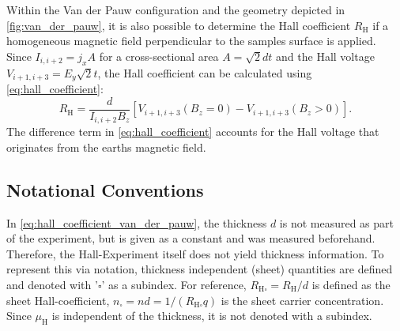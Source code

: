 Within the Van der Pauw configuration and the geometry depicted in 
\cref{fig:van_der_pauw}, it is also possible to determine the Hall 
coefficient $R_{\mathrm{H}}$ if a homogeneous magnetic field perpendicular to the 
samples surface is applied.
Since $I_{i, i+2}= j_x A$ for a cross-sectional area 
$A = \sqrt{2} d t$ and the Hall voltage $V_{i+1, i+3} = E_y \sqrt{2} t$,
the Hall coefficient can be calculated using \cref{eq:hall_coefficient}:
\begin{equation}
	R_{\mathrm{H}}=\frac{d}{I_{i, i+2}B_{z}} 
	[V_{i+1, i+3}(B_{z}=0)-V_{i+1, i+3}(B_{z}>0)].
	\label{eq:hall_coefficient_van_der_pauw}
\end{equation}
The difference term in  \cref{eq:hall_coefficient} accounts for the Hall voltage that 
originates from the earths magnetic field.

\subsection{Notational Conventions}
In \cref{eq:hall_coefficient_van_der_pauw}, the thickness $d$ is
not measured as part of the experiment, but is given as a constant and was measured
beforehand. 
Therefore, the Hall-Experiment itself does not yield thickness information.
To represent this via notation, thickness independent (sheet) quantities are defined and 
denoted with '$\square$' as a subindex.
For reference, $R_{\mathrm{H} \square}=R_\mathrm{H} / d$ is defined as the sheet 
Hall-coefficient, $n_\square = n d = 1 / (R_\mathrm{H \square}q)$ is the sheet carrier 
concentration. 
Since $\mu_\mathrm{H}$ is independent of the thickness, 
it is not denoted with a subindex.

